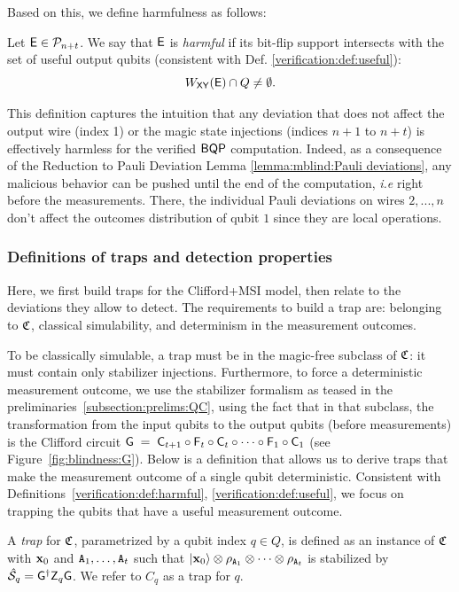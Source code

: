 Based on this, we define harmfulness as follows:
\begin{definition}
    \label{verification:def:harmful}
    Let $\mathsf{E}\in\mathcal{P}_{n+t}$. We say that $\mathsf{E}$ is \emph{harmful} if its bit-flip support intersects with the set of useful output qubits (consistent with Def. \ref{verification:def:useful}):
    $$  W_{\mathsf{X}\mathsf{Y}}(\mathsf{E}) \cap Q \neq \emptyset.$$
\end{definition}
This definition captures the intuition that any deviation that does not affect the output wire (index 1) or the magic state injections (indices $n+1$ to $n+t$) is effectively harmless for the verified $\textsf{BQP}$ computation. Indeed, as a consequence of the Reduction to Pauli Deviation Lemma \ref{lemma:mblind:Pauli deviations}, any malicious behavior can be pushed until the end of the computation, \emph{i.e} right before the measurements. There, the individual Pauli deviations on wires $2, ..., n$ don't affect the outcomes distribution of qubit $1$ since they are local operations.

\subsubsection{Definitions of traps and detection properties}
Here, we first build traps for the Clifford+MSI model, then relate to the deviations they allow to detect.
The requirements to build a trap are: belonging to $\mathfrak C$, classical simulability, and determinism in the measurement outcomes.

To be classically simulable, a trap must be in the magic-free subclass of $\mathfrak C$: it must contain only stabilizer injections.
Furthermore, to force a deterministic measurement outcome, we use the stabilizer formalism as teased in the preliminaries~\ref{subsection:prelims:QC}, using the fact that in that subclass, the transformation from the input qubits to the output qubits (before measurements) is the Clifford circuit $\mathsf{G} \;=\; \mathsf{C}_{t+1}\circ \mathsf{F}_t \circ \mathsf{C}_t \circ \cdots \circ \mathsf{F}_1 \circ \mathsf{C}_1$ (see Figure~\ref{fig:blindness:G}).
Below is a definition that allows us to derive traps that make the measurement outcome of a single qubit deterministic. Consistent with Definitions~\ref{verification:def:harmful}, \ref{verification:def:useful}, we focus on trapping the qubits that have a useful measurement outcome.

\begin{definition}
  \label{def:verification:trap}
  A \emph{trap} for $\mathfrak C$, parametrized by a qubit index $q \in Q$, is defined as an instance of $\mathfrak C$ with $\mathbf x_0$ and $\mathtt{A}_1, \dots, \mathtt{A}_t$ such that $\ket{\mathbf x_0} \otimes \rho_{\mathtt{A}_1} \otimes \dots \otimes \rho_{\mathtt{A}_t}$ is stabilized by $\hat{\mathcal{S}}_q = \mathsf{G}^\dagger \mathsf{Z}_{q} \mathsf{G}$. We refer to $C_q$ as a trap for $q$.
\end{definition}

